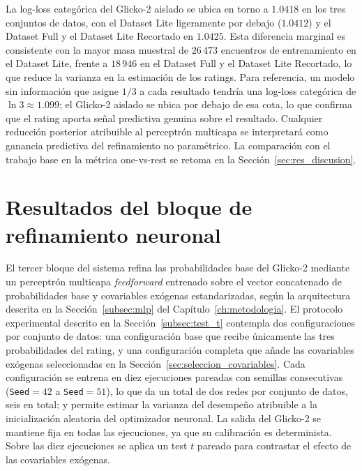 

La log-loss categ\'orica del Glicko-2 aislado se ubica en torno a $1{.}0418$ en los tres conjuntos de datos, con el Dataset Lite ligeramente por debajo ($1{.}0412$) y el Dataset Full y el Dataset Lite Recortado en $1{.}0425$. Esta diferencia marginal es consistente con la mayor masa muestral de $26\,473$ encuentros de entrenamiento en el Dataset Lite, frente a $18\,946$ en el Dataset Full y el Dataset Lite Recortado, lo que reduce la varianza en la estimaci\'on de los ratings. Para referencia, un modelo sin informaci\'on que asigne $1/3$ a cada resultado tendr\'ia una log-loss categ\'orica de $\ln 3 \approx 1{.}099$; el Glicko-2 aislado se ubica por debajo de esa cota, lo que confirma que el rating aporta se\~nal predictiva genuina sobre el resultado. Cualquier reducci\'on posterior atribuible al perceptr\'on multicapa se interpretar\'a como ganancia predictiva del refinamiento no param\'etrico. La comparaci\'on con el trabajo base en la m\'etrica one-vs-rest se retoma en la Secci\'on~\ref{sec:res_discusion}.


\section{Resultados del bloque de refinamiento neuronal}
\label{sec:res_mlp}

El tercer bloque del sistema refina las probabilidades base del Glicko-2 mediante un perceptr\'on multicapa \textit{feedforward} entrenado sobre el vector concatenado de probabilidades base y covariables ex\'ogenas estandarizadas, seg\'un la arquitectura descrita en la Secci\'on~\ref{subsec:mlp} del Cap\'itulo~\ref{ch:metodologia}. El protocolo experimental descrito en la Secci\'on~\ref{subsec:test_t} contempla dos configuraciones por conjunto de datos: una configuraci\'on base que recibe \'unicamente las tres probabilidades del rating, y una configuraci\'on completa que a\~nade las covariables ex\'ogenas seleccionadas en la Secci\'on~\ref{sec:seleccion_covariables}. Cada configuraci\'on se entrena en diez ejecuciones pareadas con semillas consecutivas (\texttt{Seed}$=42$ a \texttt{Seed}$=51$), lo que da un total de dos redes por conjunto de datos, seis en total; y permite estimar la varianza del desempe\~no atribuible a la inicializaci\'on aleatoria del optimizador neuronal. La salida del Glicko-2 se mantiene fija en todas las ejecuciones, ya que su calibraci\'on es determinista. Sobre las diez ejecuciones se aplica un test $t$ pareado para contrastar el efecto de las covariables ex\'ogenas.

